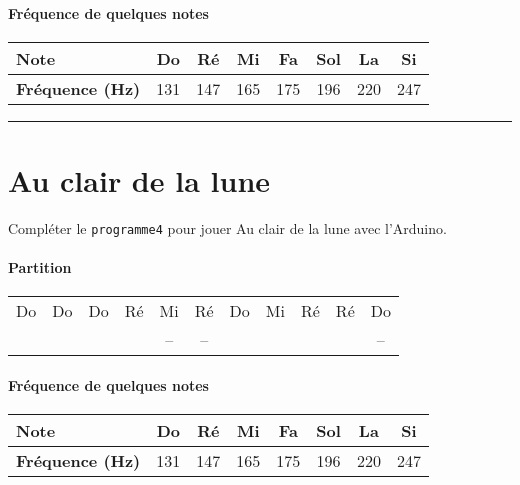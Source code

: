 \documentclass[12pt,a4paper]{article}
\begin{document}
\paragraph{Fréquence de quelques notes}

\begin{center}
\begin{tabular}{l|c|c|c|c|c|c|c}
\textbf{Note}						& \textbf{Do} & \textbf{Ré} & \textbf{Mi} & \textbf{Fa} & \textbf{Sol} & \textbf{La} & \textbf{Si} \\
\hline
\textbf{Fréquence (Hz)} 	& 131 & 147 & 165 & 175 & 196 & 220 & 247 \\
\end{tabular}
\end{center}

\hrule{}

\section*{Au clair de la lune}

Compléter le \texttt{programme4} pour jouer \og Au clair de la lune \fg{} avec l'Arduino.

\paragraph{Partition}

\begin{center}
\begin{tabular}{|ccccccccccc|}
\hline
Do 		& Do 		& Do 		& Ré 		& Mi 		& Ré 		& Do 		& Mi 		& Ré 		& Ré 		& Do \\
\cdot	& \cdot	& \cdot	& \cdot	& --			& --			& \cdot	& \cdot	& \cdot	& \cdot	& -- \\
\hline
\end{tabular}
\end{center}

\paragraph{Fréquence de quelques notes}

\begin{center}
\begin{tabular}{l|c|c|c|c|c|c|c}
\textbf{Note}						& \textbf{Do} & \textbf{Ré} & \textbf{Mi} & \textbf{Fa} & \textbf{Sol} & \textbf{La} & \textbf{Si} \\
\hline
\textbf{Fréquence (Hz)} 	& 131 & 147 & 165 & 175 & 196 & 220 & 247 \\
\end{tabular}
\end{center}
\end{document}
